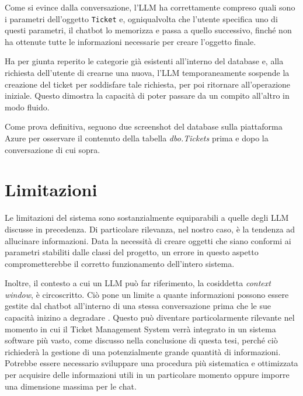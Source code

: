 Come si evince dalla conversazione, l'LLM ha correttamente compreso quali sono i parametri dell'oggetto \texttt{Ticket} e, ogniqualvolta che l'utente specifica 
uno di questi parametri, il chatbot lo memorizza e passa a quello successivo, finché non ha ottenute tutte le informazioni necessarie per creare l'oggetto finale.

Ha per giunta reperito le categorie già esistenti all'interno del database e, alla richiesta dell'utente di crearne una nuova, 
l'LLM temporaneamente sospende la creazione del ticket per soddisfare tale richiesta, per poi ritornare all'operazione iniziale. 
Questo dimostra la capacità di poter passare da un compito all'altro in modo fluido.

\newpage
Come prova definitiva, seguono due screenshot del database sulla piattaforma Azure per osservare il contenuto della tabella \textit{dbo.Tickets} 
prima e dopo la conversazione di cui sopra.



\newpage
\section{Limitazioni}
Le limitazioni del sistema sono sostanzialmente equiparabili a quelle degli LLM discusse in precedenza. Di particolare rilevanza, nel nostro caso, 
è la tendenza ad allucinare informazioni. Data la necessità di creare oggetti che siano conformi ai parametri stabiliti dalle classi del progetto, 
un errore in questo aspetto comprometterebbe il corretto funzionamento dell'intero sistema.

Inoltre, il contesto a cui un LLM può far riferimento, la cosiddetta \textit{context window}, è circoscritto. Ciò pone un limite a quante informazioni 
possono essere gestite dal chatbot all'interno di una stessa conversazione prima che le sue capacità inizino a degradare \cite{ibm_context_window}. 
Questo può diventare particolarmente rilevante nel momento in cui il Ticket Management System verrà integrato in un sistema software più vasto, 
come discusso nella conclusione di questa tesi, perché ciò richiederà la gestione di una potenzialmente grande quantità di 
informazioni. Potrebbe essere necessario sviluppare una procedura più sistematica e ottimizzata per acquisire delle informazioni utili
in un particolare momento oppure imporre una dimensione massima per le chat.